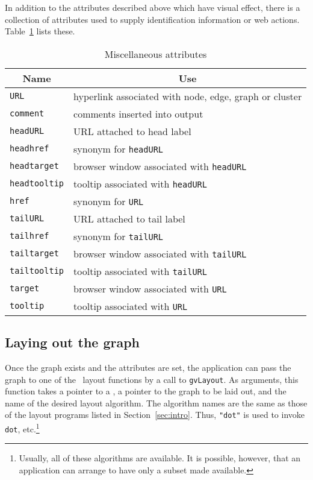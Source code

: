In addition to the attributes described above which have visual effect,
there is a collection of attributes used to supply identification
information or web actions. Table~\ref{tab:web} lists these.
\begin{table}[htbp]\footnotesize
\centering
\begin{tabular}[t]{|l|p{3.5in}|} \hline
\multicolumn{1}{|c|}{Name} & \multicolumn{1}{c|}{Use} \\ \hline
{\tt URL} & hyperlink associated with node, edge, graph or cluster \\
{\tt comment} & comments inserted into output \\
{\tt headURL} & URL attached to head label \\
{\tt headhref} & synonym for {\tt headURL} \\
{\tt headtarget} & browser window associated with {\tt headURL} \\
{\tt headtooltip} & tooltip associated with {\tt headURL} \\
{\tt href} & synonym for {\tt URL} \\
{\tt tailURL} & URL attached to tail label \\
{\tt tailhref} & synonym for {\tt tailURL} \\
{\tt tailtarget} & browser window associated with {\tt tailURL} \\
{\tt tailtooltip} & tooltip associated with {\tt tailURL} \\
{\tt target} & browser window associated with {\tt URL} \\
{\tt tooltip} & tooltip associated with {\tt URL} \\
\hline
\end{tabular}
\caption{Miscellaneous attributes}
\label{tab:web}
\end{table}

\subsection{Laying out the graph}

Once the graph exists and the attributes are set, the application can
pass the graph to one of the \gviz\ layout functions by a call to
{\tt gvLayout}. As arguments, this function takes a pointer to a \gvc, a
pointer to the graph to be laid out, and the name of the desired layout
algorithm. The algorithm names are the same as those of the layout
programs listed in Section~\ref{sec:intro}. Thus, {\tt "dot"} is used
to invoke {\tt dot}, etc.\footnote{Usually, all of these algorithms
are available. It is possible, however, that an application can arrange
to have only a subset made available.}


